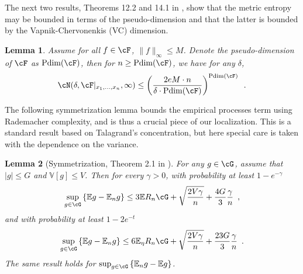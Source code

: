 \documentclass[11pt]{article}
\newtheorem{lemma}{Lemma}
\numberwithin{equation}{section}
\theoremstyle{definition}
\newcommand{\E}{\mathbb{E}}
\newcommand{\V}{\mathbb{V}}
\begin{document}
\begin{appendices}

The next two results, Theorems 12.2 and 14.1 in \cite{Anthony-Bartlett1999_book}, show that the metric entropy may be bounded in terms of the pseudo-dimension and that the latter is bounded by the Vapnik-Chervonenkis (VC) dimension.
\begin{lemma}%
	\label{lem:ps-dim}
	Assume for all $f \in \cF$,  $\| f \|_\infty \leq M$. Denote the pseudo-dimension of $\cF$ as ${\rm Pdim}(\cF)$, then for $n \geq {\rm Pdim}(\cF)$, we have for any $\delta$,
	\[
		 \cN(\delta, \cF|_{x_1, \ldots, x_n}, \infty) \leq \left( \frac{2e M \cdot n}{\delta \cdot {\rm Pdim}(\cF)} \right)^{{\rm Pdim}(\cF)} \enspace.
	\]
\end{lemma}





The following symmetrization lemma bounds the empirical processes term using Rademacher complexity, and is thus a crucial piece of our localization. This is a standard result based on Talagrand's concentration, but here special care is taken with the dependence on the variance. 
\begin{lemma}[Symmetrization, Theorem 2.1 in \cite{bartlett2005local}]
	\label{lem:symmetrization}
	For any $g \in \cG$, assume that $|g| \leq G$ and $\V[g] \leq V$. Then for every $\gamma > 0$, with probability at least $1 - e^{-\gamma}$
	\[
		\sup_{g \in \cG} \left\{ \E g - \E_n g \right\} \leq 3 \E R_n \cG + \sqrt{\frac{2V \gamma}{n}} + \frac{4 G}{3} \frac{\gamma}{n} \enspace ,
	\]
	and with probability at least $1 - 2e^{-t}$
	\[
		\sup_{g \in \cG} \left\{ \E g - \E_n g \right\} \leq 6 \E_\eta R_n \cG + \sqrt{\frac{2V \gamma}{n}} + \frac{23 G}{3} \frac{\gamma}{n} \enspace.
	\]
	The same result holds for $\sup_{g \in \cG} \left\{  \E_n g  - \E g \right\}$.	
\end{lemma}




\end{appendices}
\end{document}
